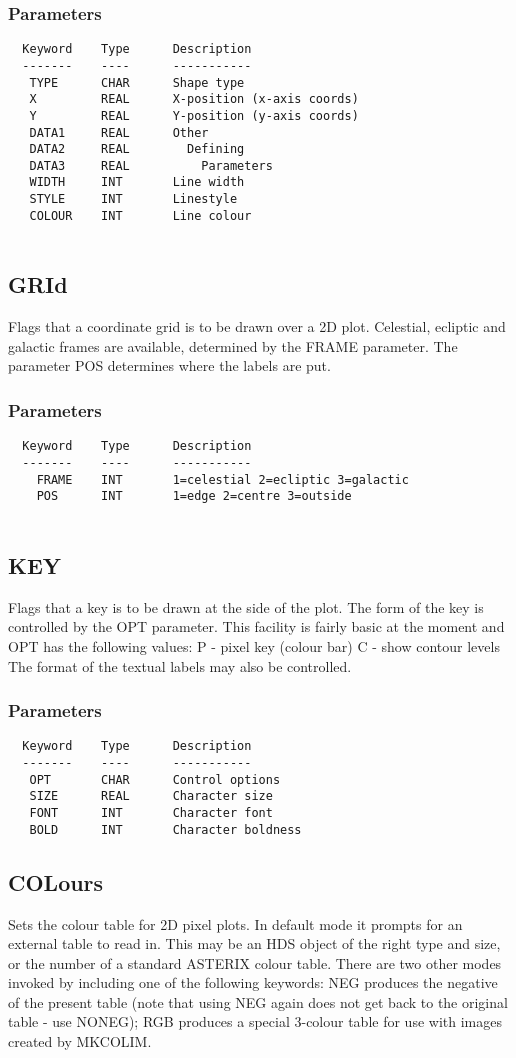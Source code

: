 \documentclass{book}
\renewcommand{\_}{{\tt\char'137}}     %
\begin{document}
\subsubsection{Parameters}
\begin{verbatim}
  Keyword    Type      Description
  -------    ----      -----------
   TYPE      CHAR      Shape type
   X         REAL      X-position (x-axis coords)
   Y         REAL      Y-position (y-axis coords)
   DATA1     REAL      Other
   DATA2     REAL        Defining
   DATA3     REAL          Parameters
   WIDTH     INT       Line width
   STYLE     INT       Linestyle
   COLOUR    INT       Line colour
 
\end{verbatim}\subsection{GRId}
Flags that a coordinate grid is to be drawn over a 2D plot.
Celestial, ecliptic and galactic frames are available,
determined by the FRAME parameter. The parameter POS
determines where the labels are put.
 
\subsubsection{Parameters}
\begin{verbatim}
  Keyword    Type      Description
  -------    ----      -----------
    FRAME    INT       1=celestial 2=ecliptic 3=galactic
    POS      INT       1=edge 2=centre 3=outside
 
\end{verbatim}\subsection{KEY}
Flags that a key is to be drawn at the side of the plot. The form
of the key is controlled by the OPT parameter. This facility is
fairly basic at the moment and OPT has the following values:
P - pixel key (colour bar)
C - show contour levels
The format of the textual labels may also be controlled.
\subsubsection{Parameters}
\begin{verbatim}
  Keyword    Type      Description
  -------    ----      -----------
   OPT       CHAR      Control options
   SIZE      REAL      Character size
   FONT      INT       Character font
   BOLD      INT       Character boldness
\end{verbatim}\subsection{COLours}
Sets the colour table for 2D pixel plots. In default mode
it prompts for an external table to read in. This may be an
HDS object of the right type and size, or the number of a
standard ASTERIX colour table. There are two other modes
invoked by including one of the following keywords: NEG produces
the negative of the present table (note that using NEG again does
not get back to the original table - use NONEG); RGB produces a
special 3-colour table for use with images created by MKCOLIM.
\end{document}
